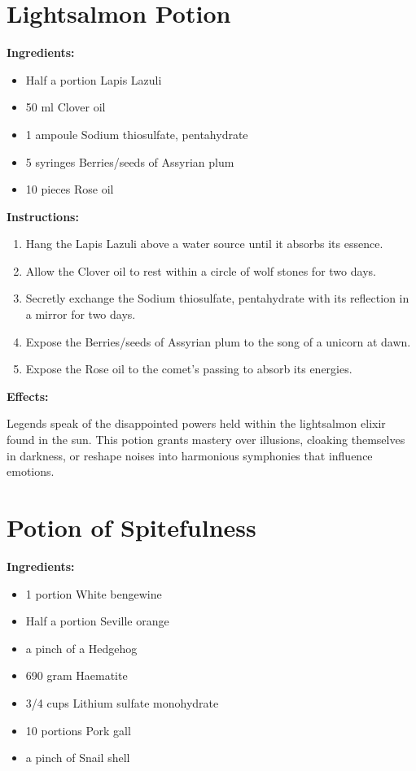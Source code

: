\documentclass{article}
\begin{document}
\newpage
\section*{Lightsalmon Potion}

\textbf{Ingredients:}

\begin{itemize}
  \item Half a portion Lapis Lazuli
  \item 50 ml Clover oil
  \item 1 ampoule Sodium thiosulfate, pentahydrate
  \item 5 syringes Berries/seeds of Assyrian plum
  \item 10 pieces Rose oil
\end{itemize}

\textbf{Instructions:}

\begin{enumerate}
  \item Hang the Lapis Lazuli above a water source until it absorbs its essence.
  \item Allow the Clover oil to rest within a circle of wolf stones for two days.
  \item Secretly exchange the Sodium thiosulfate, pentahydrate with its reflection in a mirror for two days.
  \item Expose the Berries/seeds of Assyrian plum to the song of a unicorn at dawn.
  \item Expose the Rose oil to the comet’s passing to absorb its energies.
\end{enumerate}

\textbf{Effects:}

Legends speak of the disappointed powers held within the lightsalmon elixir found in the sun. This potion grants mastery over illusions, cloaking themselves in darkness, or reshape noises into harmonious symphonies that influence emotions.

\newpage
\section*{Potion of Spitefulness}

\textbf{Ingredients:}

\begin{itemize}
  \item 1 portion White bengewine
  \item Half a portion Seville orange
  \item a pinch of a Hedgehog
  \item 690 gram Haematite
  \item 3/4 cups Lithium sulfate monohydrate
  \item 10 portions Pork gall
  \item a pinch of Snail shell
\end{itemize}
\end{document}
